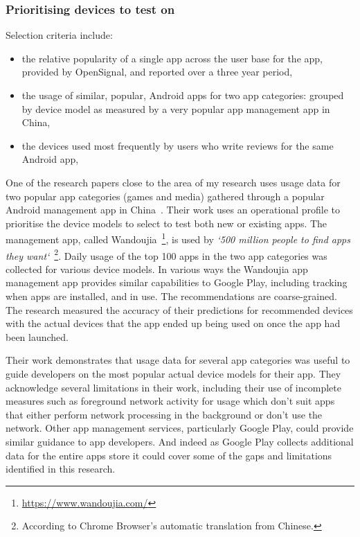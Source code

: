 \subsubsection{Prioritising devices to test on}

Selection criteria include:
\begin{itemize}
    \item the relative popularity of a single app across the user base for the app, provided by OpenSignal, and reported over a three year period,
    \item the usage of similar, popular, Android apps for two app categories: grouped by device model as measured by a very popular app management app in China,
    \item the devices used most frequently by users who write reviews for the same Android app,
\end{itemize}

One of the research papers close to the area of my research uses usage data for two popular app categories (games and media) gathered through a popular Android management app in China~. Their work uses an operational profile to prioritise the device models to select to test both new or existing apps. The management app, called Wandoujia~\footnote{\url{https://www.wandoujia.com/}}, is used by \emph{`500 million people to find apps they want`}~\footnote{According to Chrome Browser's automatic translation from Chinese.}. Daily usage of the top 100 apps in the two app categories was collected for various device models. In various ways the Wandoujia app management app provides similar capabilities to Google Play, including tracking when apps are installed, and in use. The recommendations are coarse-grained. The research measured the accuracy of their predictions for recommended devices with the actual devices that the app ended up being used on once the app had been launched. 

Their work demonstrates that usage data for several app categories was useful to guide developers on the most popular actual device models for their app. They acknowledge several limitations in their work, including their use of incomplete measures such as foreground network activity for usage which don't suit apps that either perform network processing in the background or don't use the network. Other app management services, particularly Google Play, could provide similar guidance to app developers. And indeed as Google Play collects additional data for the entire apps store it could cover some of the gaps and limitations identified in this research.


